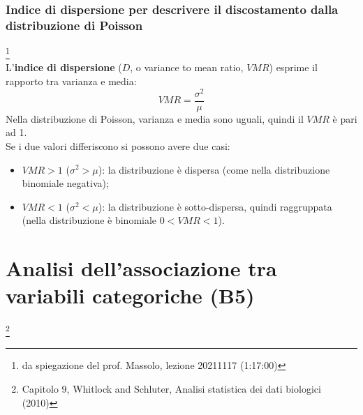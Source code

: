 \documentclass[10pt, draft]{book}
\begin{document}
\subsection{Indice di dispersione per descrivere il discostamento dalla distribuzione di Poisson}\footnote{da spiegazione del prof. Massolo, lezione 20211117 (1:17:00)}
\\
L'\textbf{indice di dispersione} ($D$, o variance to mean ratio, $VMR$) esprime il rapporto tra varianza e media:
\begin{equation}
VMR = \frac{\sigma^2}{\mu}
\end{equation}
Nella distribuzione di Poisson, varianza e media sono uguali, quindi il $VMR$ è pari ad 1.
\\
Se i due valori differiscono si possono avere due casi:
\begin{itemize}
    \item $VMR > 1$ ($\sigma^2 > \mu$): la distribuzione è dispersa (come nella distribuzione binomiale negativa);
    \item $VMR < 1$ ($\sigma^2 < \mu$): la distribuzione è sotto-dispersa, quindi raggruppata (nella distribuzione è binomiale $0 < VMR < 1$).
\end{itemize}

\chapter{Analisi dell'associazione tra variabili categoriche (B5)}\footnote{Capitolo 9, Whitlock and Schluter, Analisi statistica dei dati biologici (2010)}
\end{document}
